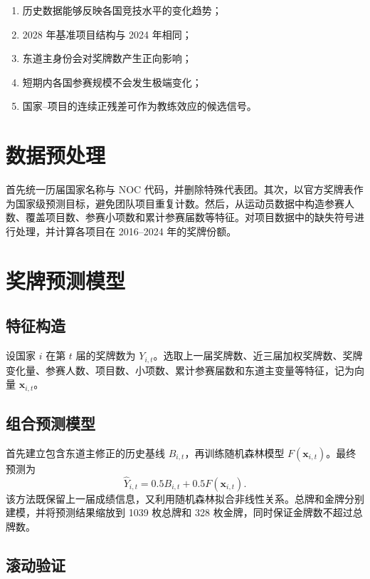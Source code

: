\documentclass[UTF8,11pt,a4paper]{ctexart}
\begin{document}
\begin{enumerate}
\item 历史数据能够反映各国竞技水平的变化趋势；
\item 2028 年基准项目结构与 2024 年相同；
\item 东道主身份会对奖牌数产生正向影响；
\item 短期内各国参赛规模不会发生极端变化；
\item 国家--项目的连续正残差可作为教练效应的候选信号。
\end{enumerate}

\section{数据预处理}

首先统一历届国家名称与 NOC 代码，并删除特殊代表团。其次，以官方奖牌表作为国家级预测目标，避免团队项目重复计数。然后，从运动员数据中构造参赛人数、覆盖项目数、参赛小项数和累计参赛届数等特征。对项目数据中的缺失符号进行处理，并计算各项目在 2016--2024 年的奖牌份额。

\section{奖牌预测模型}

\subsection{特征构造}

设国家 $i$ 在第 $t$ 届的奖牌数为 $Y_{i,t}$。选取上一届奖牌数、近三届加权奖牌数、奖牌变化量、参赛人数、项目数、小项数、累计参赛届数和东道主变量等特征，记为向量 $\boldsymbol{x}_{i,t}$。

\subsection{组合预测模型}

首先建立包含东道主修正的历史基线 $B_{i,t}$，再训练随机森林模型 $F(\boldsymbol{x}_{i,t})$。最终预测为
\begin{equation}
\widehat{Y}_{i,t}=0.5B_{i,t}+0.5F(\boldsymbol{x}_{i,t}).
\end{equation}
该方法既保留上一届成绩信息，又利用随机森林拟合非线性关系。总牌和金牌分别建模，并将预测结果缩放到 1039 枚总牌和 328 枚金牌，同时保证金牌数不超过总牌数。

\subsection{滚动验证}
\end{document}
